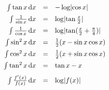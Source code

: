 \[\begin{array}{rcll}
		\int \tan x             \,\mathrm{d} x & = & -\log\lvert \cos x \rvert                                              &             \\[0.5em]
		\int \frac{1}{\sin x}   \,\mathrm{d} x & = & \log\lvert \tan\frac{x}{2} \rvert                                      &             \\[0.5em]
		\int \frac{1}{\cos x}   \,\mathrm{d} x & = & \log\lvert \tan(\frac{x}{2}+\frac{\pi}{4}) \rvert                      &             \\[0.5em]
		\int \sin^2 x           \,\mathrm{d} x & = & \frac{1}{2}(x-\sin x\cos x)                                    &             \\[0.5em]
		\int \cos^2 x           \,\mathrm{d} x & = & \frac{1}{2}(x+\sin x\cos x)                                    &             \\[0.5em]
		\int \tan^2 x           \,\mathrm{d} x & = & \tan x - x                                                     &             \\[0.75em]
		\int \frac{f'(x)}{f(x)} \,\mathrm{d} x & = & \log\lvert f(x) \rvert                                                 &
	\end{array}
\]

